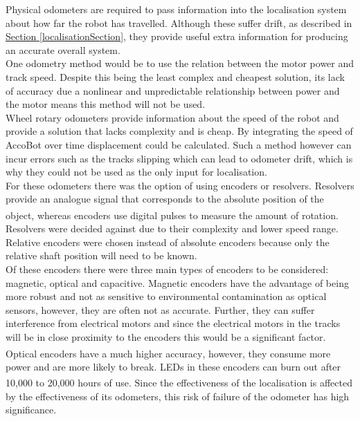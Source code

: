 \documentclass[11pt]{article}		%
\newcommand{\supercite}[1]{\textsuperscript{\cite{#1}}}		%
\newcommand{\sectref}[1]{\hyperref[#1]{Section \ref*{#1}}}     %
\begin{document}
	        Physical odometers are required to pass information into the localisation system about how far the robot has travelled. Although these suffer drift, as described in \sectref{localisationSection}, they provide useful extra information for producing an accurate overall system.
            \\
            \hspace*{3ex}One odometry method would be to use the relation between the motor power and track speed. Despite this being the least complex and cheapest solution, its lack of accuracy due a nonlinear and unpredictable relationship between power and the motor means this method will not be used.
            \\
            \hspace*{3ex}Wheel rotary odometers provide information about the speed of the robot and provide a solution that lacks complexity and is cheap. By integrating the speed of AccoBot over time displacement could be calculated. Such a method however can incur errors such as the tracks slipping which can lead to odometer drift, which is why they could not be used as the only input for localisation.
            \\
            \hspace*{3ex}For these odometers there was the option of using encoders or resolvers. Resolvers provide an analogue signal that corresponds to the absolute position of the object, whereas encoders use digital pulses to measure the amount of rotation.\supercite{Encoder_resolver} Resolvers were decided against due to their complexity and lower speed range. Relative encoders were chosen instead of absolute encoders because only the relative shaft position will need to be known.
            \\
            \hspace*{3ex}Of these encoders there were three main types of encoders to be considered: magnetic, optical and capacitive. Magnetic encoders have the advantage of being more robust and not as sensitive to environmental contamination as optical sensors, however, they are often not as accurate. Further, they can suffer interference from electrical motors and since the electrical motors in the tracks will be in close proximity to the encoders this would be a significant factor. 
            \\
            \hspace*{3ex}Optical encoders have a much higher accuracy\supercite{Encoders}, however, they consume more power and are more likely to break. LEDs in these encoders can burn out after 10,000 to 20,000 hours of use.\supercite{Encoders} Since the effectiveness of the localisation is affected by the effectiveness of its odometers, this risk of failure of the odometer has high significance. 
\end{document}
